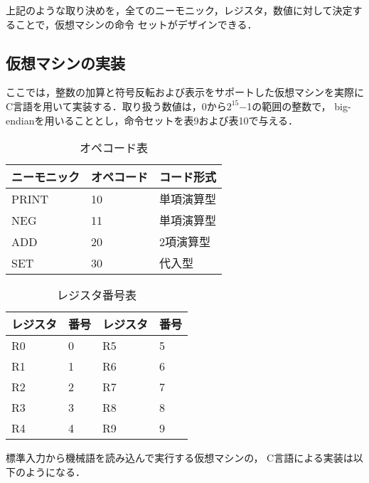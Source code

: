 \documentclass[a4j]{jsarticle}  %
\begin{document}
上記のような取り決めを，全てのニーモニック，レジスタ，数値に対して決定することで，仮想マシンの命令
セットがデザインできる．

\subsection{仮想マシンの実装}
ここでは，整数の加算と符号反転および表示をサポートした仮想マシンを実際に
C言語を用いて実装する．取り扱う数値は，0から$2^{15}$−1の範囲の整数で，
big-endianを用いることとし，命令セットを表9および表10で与える．

\begin{table}[htb]
  \begin{center}
    \caption{オペコード表}
\begin{tabular}{l|ll} \hline
ニーモニック & オペコード & コード形式 \\ \hline
PRINT & 10 & 単項演算型  \\
NEG & 11 & 単項演算型  \\
ADD & 20 & 2項演算型  \\
SET & 30 & 代入型  \\\hline
\end{tabular} 
\end{center}
\end{table}

\begin{table}[htb]
  \begin{center}
    \caption{レジスタ番号表}
\begin{tabular}{l|l||l|l} \hline
レジスタ & 番号 & レジスタ & 番号 \\ \hline
R0 & 0 & R5 & 5 \\
R1 & 1 & R6 & 6 \\
R2 & 2 & R7 & 7 \\
R3 & 3 & R8 & 8 \\
R4 & 4 & R9 & 9  \\ \hline
\end{tabular} 
\end{center}
\end{table}

標準入力から機械語を読み込んで実行する仮想マシンの，
C言語による実装は以下のようになる．
\end{document}
